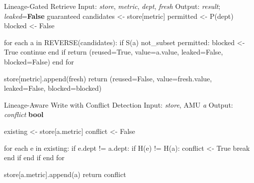 \documentclass[9pt,twocolumn,twoside]{extarticle}
\begin{document}
\begin{algorithmbox}[label={alg:retrieve}]{Lineage-Gated Retrieve}{%
  \textnormal{Input: \textit{store}, \textit{metric}, \textit{dept}, \textit{fresh}}%
  \quad Output: \textit{result}; \textit{leaked}=\textbf{False} guaranteed}
candidates <- store[metric]         %
permitted  <- P(dept)               %
blocked    <- False

for each a in REVERSE(candidates):  %
  if S(a) not_subset permitted:     %
    blocked <- True
    continue                        %
  end if
  return (reused=True, value=a.value, leaked=False, blocked=False)
end for

store[metric].append(fresh)
return (reused=False, value=fresh.value, leaked=False, blocked=blocked)
\end{algorithmbox}

\begin{algorithmbox}[label={alg:write}]{Lineage-Aware Write with Conflict Detection}{%
  \textnormal{Input: \textit{store}, AMU \textit{a}} \quad
  Output: \textit{conflict} \textbf{bool}}

existing <- store[a.metric]   %
conflict <- False

for each e in existing:
  if e.dept != a.dept:        %
    if H(e) != H(a):          %
      conflict <- True
      break                   %
    end if
  end if
end for

store[a.metric].append(a)     %
return conflict
\end{algorithmbox}
\end{document}
